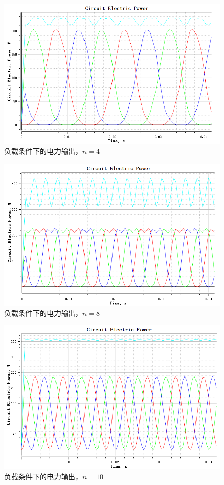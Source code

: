 \documentclass{thuemp}
\begin{document}
\begin{figure}[H]
  \centering
  \includegraphics[width=1\linewidth]{./img/task3/power-n4-load.png}
  \caption{负载条件下的电力输出，$n=4$}
\end{figure}
\begin{figure}[H]
  \centering
  \includegraphics[width=1\linewidth]{./img/task3/power-n8-load.png}
  \caption{负载条件下的电力输出，$n=8$}
\end{figure}
\begin{figure}[H]
  \centering
  \includegraphics[width=1\linewidth]{./img/task3/power-n10-load.png}
  \caption{负载条件下的电力输出，$n=10$}
\end{figure}
\end{document}
